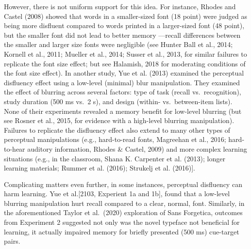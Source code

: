 \documentclass[
  english,
  jou]{apa7}
\begin{document}
However, there is not uniform support for this idea. For instance, Rhodes and Castel (2008) showed that words in a smaller-sized font (18 point) were judged as being more disfluent compared to words printed in a larger-sized font (48 point), but the smaller font did not lead to better memory ---recall differences between the smaller and larger size fonts were negligible (see Hunter Ball et al., 2014; Kornell et al., 2011; Mueller et al., 2014; Susser et al., 2013, for similar failures to replicate the font size effect; but see Halamish, 2018 for moderating conditions of the font size effect). In another study, Yue et al. (2013) examined the perceptual disfluency effect using a low-level (minimal) blur manipulation. They examined the effect of blurring across several factors: type of task (recall vs.~recognition), study duration (500 ms vs.~2 s), and design (within- vs.~between-item lists). None of their experiments revealed a memory benefit for low-level blurring (but see Rosner et al., 2015, for evidence with a high-level blurring manipulation). Failures to replicate the disfluency effect also extend to many other types of perceptual manipulations (e.g., hard-to-read fonts, Magreehan et al., 2016; hard-to-hear auditory information, Rhodes \& Castel, 2009) and more complex learning situations (e.g., in the classroom, Shana K. Carpenter et al. (2013); longer learning materials; Rummer et al. (2016); Strukelj et al. (2016){]}.

Complicating matters even further, in some instances, perceptual disfluency can harm learning. Yue et al.{[}2103, Experient 1a and 1b{]}, found that a low-level blurring manipulation hurt recall compared to a clear, normal, font. Similarly, in the aforementioned Taylor et al.~(2020) exploration of Sans Forgetica, outcomes from Experiment 2 suggested not only was the novel typeface not beneficial for learning, it actually impaired memory for briefly presented (500 ms) cue-target pairs.
\end{document}
